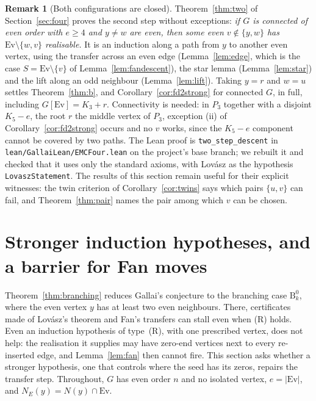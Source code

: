 \documentclass[11pt]{amsart}
\theoremstyle{definition}
\newtheorem{remark}[theorem]{Remark}
\newcommand{\Ev}{\mathrm{Ev}}
\begin{document}
\begin{remark}[Both configurations are closed]\label{rem:twostep}
Theorem~\ref{thm:two} of Section~\ref{sec:four} proves the second step without exceptions:
\emph{if $G$ is connected of even order with $e\ge4$ and $y\ne w$ are even, then some even
$v\notin\{y,w\}$ has $\Ev\setminus\{w,v\}$ realisable.} It is an induction along a path from $y$ to
another even vertex, using the transfer across an even edge (Lemma~\ref{lem:edge}, which is the case
$S=\Ev\setminus\{v\}$ of Lemma~\ref{lem:fandescent}), the star lemma (Lemma~\ref{lem:star}) and the
lift along an odd neighbour (Lemma~\ref{lem:lift}). Taking $y=r$ and $w=u$ settles
Theorem~\ref{thm:b}, and Corollary~\ref{cor:fd2strong} for connected $G$, in full, including
$G[\Ev]=K_3+r$. Connectivity is needed: in $P_3$ together with a disjoint $K_5-e$, the root $r$ the
middle vertex of $P_3$, exception (ii) of Corollary~\ref{cor:fd2strong} occurs and no $v$ works,
since the $K_5-e$ component cannot be covered by two paths. The Lean
proof is \texttt{two\_step\_descent} in \texttt{lean/GallaiLean/EMCFour.lean} on the project's base
branch; we rebuilt it and checked that it uses only the standard axioms, with Lov\'asz as the hypothesis
\texttt{LovaszStatement}. The results of this section remain useful for their explicit witnesses:
the twin criterion of Corollary~\ref{cor:twins} says which pairs $\{u,v\}$ can fail, and
Theorem~\ref{thm:pair} names the pair among which $v$ can be chosen.
\end{remark}

\section{Stronger induction hypotheses, and a barrier for Fan moves}\label{sec:H}

Theorem~\ref{thm:branching} reduces Gallai's conjecture to the branching case $\mathrm{B}^0_k$, where
the even vertex $y$ has at least two even neighbours. There, certificates made of Lov\'asz's theorem
and Fan's transfers can stall even when (R) holds. Even an induction hypothesis of type~(R), with one
prescribed vertex, does not help: the realisation it supplies may have zero-end vertices next to every
re-inserted edge, and Lemma~\ref{lem:fan} then cannot fire. This section asks whether a stronger
hypothesis, one that controls where the seed has its zeros, repairs the transfer step. Throughout, $G$
has even order $n$ and no isolated vertex, $e=|\Ev|$, and $N_E(y)=N(y)\cap\Ev$.
\end{document}
